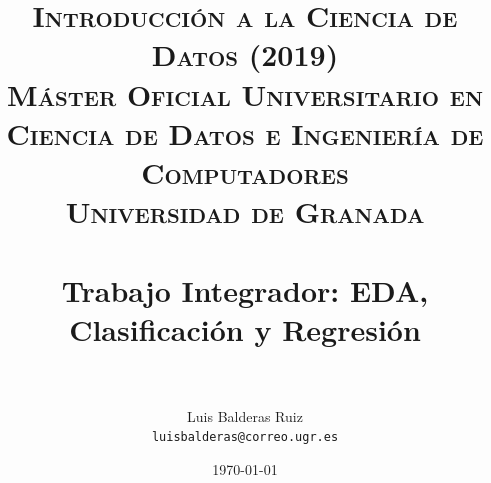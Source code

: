 
\graphicspath{ {./images/} }
\usepackage{subcaption}
\usepackage{hyperref}
\usepackage{soul}



\title{	
\normalfont \normalsize 
\textsc{\textbf{Introducción a la Ciencia de Datos (2019)} \\ Máster Oficial Universitario en Ciencia de Datos e Ingeniería de Computadores \\ Universidad de Granada} \\ [25pt] %
\horrule{0.5pt} \\[0.4cm] %
\huge Trabajo Integrador: EDA, Clasificación y Regresión \\ %
\horrule{2pt} \\[0.5cm] %
}

\author{Luis Balderas Ruiz \\ \texttt{luisbalderas@correo.ugr.es}} 


\date{\normalsize\today} %




\maketitle %

\newpage %

\tableofcontents %

\listoffigures

\listoftables

\newpage

%


